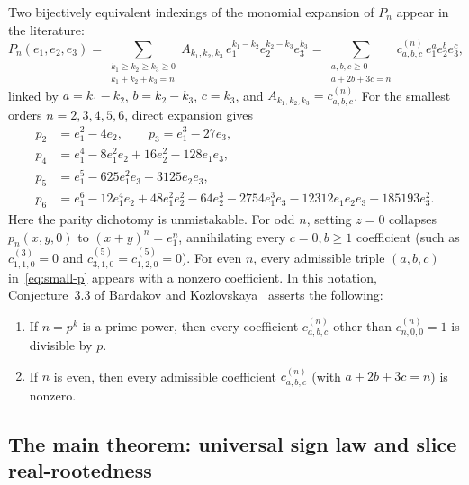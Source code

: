 \documentclass[10pt]{article}
\numberwithin{equation}{section}
\theoremstyle{plain}
\theoremstyle{definition}
\newcommand{\1}{\mathbf{1}}
\begin{document}
Two bijectively equivalent indexings of the monomial expansion of $P_n$ appear in the literature:
\begin{equation}\label{eq:P-expansion}
P_n(e_1, e_2, e_3)
= \sum_{\substack{k_1 \ge k_2 \ge k_3 \ge 0 \\ k_1 + k_2 + k_3 = n}} A_{k_1, k_2, k_3}\, e_1^{k_1 - k_2} e_2^{k_2 - k_3} e_3^{k_3}
= \sum_{\substack{a, b, c \ge 0 \\ a + 2b + 3c = n}} c_{a,b,c}^{(n)}\, e_1^a e_2^b e_3^c,
\end{equation}
linked by $a = k_1 - k_2$, $b = k_2 - k_3$, $c = k_3$, and $A_{k_1,k_2,k_3} = c_{a,b,c}^{(n)}$. For the smallest orders $n = 2, 3, 4, 5, 6$, direct expansion gives
\begin{subequations}\label{eq:small-p}
\begin{align}
p_2 &= e_1^2 - 4 e_2, \qquad p_3 = e_1^3 - 27 e_3, \\
p_4 &= e_1^4 - 8 e_1^2 e_2 + 16 e_2^2 - 128 e_1 e_3, \\
p_5 &= e_1^5 - 625 e_1^2 e_3 + 3125 e_2 e_3, \\
p_6 &= e_1^6 - 12 e_1^4 e_2 + 48 e_1^2 e_2^2 - 64 e_2^3 - 2754 e_1^3 e_3 - 12312 e_1 e_2 e_3 + 185193 e_3^2.
\end{align}
\end{subequations}
Here the parity dichotomy is unmistakable. For odd $n$, setting $z = 0$ collapses $p_n(x, y, 0)$ to $(x + y)^n = e_1^n$, annihilating every $c = 0, b \ge 1$ coefficient (such as $c_{1,1,0}^{(3)} = 0$ and $c_{3,1,0}^{(5)} = c_{1,2,0}^{(5)} = 0$). For even $n$, every admissible triple $(a, b, c)$ in~\eqref{eq:small-p} appears with a nonzero coefficient. In this notation, Conjecture~3.3 of Bardakov and Kozlovskaya~\cite{BK2023} asserts the following:
\begin{enumerate}[label=(\arabic*)]
    \item If $n = p^k$ is a prime power, then every coefficient $c_{a,b,c}^{(n)}$ other than $c_{n,0,0}^{(n)} = 1$ is divisible by $p$.
    \item If $n$ is even, then every admissible coefficient $c_{a,b,c}^{(n)}$ (with $a + 2b + 3c = n$) is nonzero.
\end{enumerate}

\subsection{The main theorem: universal sign law and slice real-rootedness}
\label{sec:main-theorem}
\end{document}
